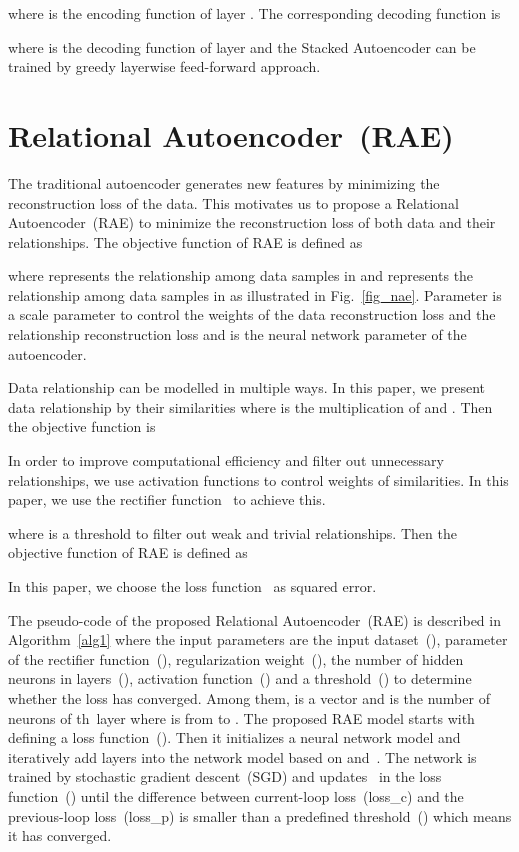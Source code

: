 \documentclass[conference]{IEEEtran}
\begin{document}
	where  is the encoding function of layer . The corresponding decoding function is
	
	where  is the decoding function of layer  and the Stacked Autoencoder can be trained by greedy layerwise feed-forward approach.
	
	\section{Relational Autoencoder~(RAE)}  \label{sec4}
	The traditional autoencoder generates new features by minimizing the reconstruction loss of the data. This motivates us to propose a Relational Autoencoder~(RAE) to minimize the reconstruction loss of both data and their relationships. The objective function of RAE is defined as
	
	where  represents the relationship among data samples in  and  represents the relationship among data samples in  as illustrated in Fig.~\ref{fig_nae}. Parameter  is a scale parameter to control the weights of the data reconstruction loss and the relationship reconstruction loss and  is the neural network parameter of the autoencoder.
	
	Data relationship can be modelled in multiple ways. In this paper, we present data relationship by their similarities where  is the multiplication of  and . Then the objective function is
	
	
	In order to improve computational efficiency and filter out unnecessary relationships, we use activation functions to control weights of similarities. In this paper, we use the rectifier function~\cite{lecun2015deep} to achieve this.
	
	where  is a threshold to filter out weak and trivial relationships. Then the objective function of RAE is defined as
	
	In this paper, we choose the loss function~ as squared error.
	
	The pseudo-code of the proposed Relational Autoencoder~(RAE) is described in Algorithm~\ref{alg1} where the input parameters are the input dataset~(), parameter of the rectifier function~(), regularization weight~(), the number of hidden neurons in layers~(), activation function~() and a threshold~() to determine whether the loss has converged. Among them,  is a vector and  is the number of neurons of th~layer where  is from  to . The proposed RAE model starts with defining a loss function~(). Then it initializes a neural network model and iteratively add layers into the network model based on  and~. The network is trained by stochastic gradient descent~(SGD) and updates~ in the loss function~() until the difference between current-loop loss~(loss\_c) and the previous-loop loss~(loss\_p) is smaller than a predefined threshold~() which means it has converged.
	
\end{document}
